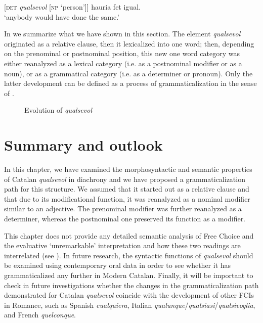 \documentclass[output=paper,colorlinks,citecolor=brown]{langscibook}
\begin{document}
\ea \label{ex:ka45}
    [\textsc{det} \textit{qualsevol} [\textsc{np} ‘person’]] hauria fet igual.\\
    ‘anybody would have done the same.’
\z

In  we summarize what we have shown in this section. The element \textit{qualsevol} originated as a relative clause, then it lexicalized into one word; then, depending on the prenominal or postnominal position, this new one word category was either reanalyzed as a lexical category (i.e. as a postnominal modifier or as a noun), or as a grammatical category (i.e. as a determiner or pronoun). Only the latter development can be defined as a process of grammaticalization in the sense of \citet{Lehmann1985}.

\begin{figure}
\caption{Evolution of \textit{qualsevol}}
\label{fig:ka46}
\end{figure}


\section{Summary and outlook}\label{sec:kea7}

In this chapter, we have examined the morphosyntactic and semantic properties of Catalan \textit{qualsevol} in diachrony and we have proposed a grammaticalization path for this structure. We assumed that it started out as a relative clause and that due to its modificational function, it was reanalyzed as a nominal modifier similar to an adjective. The prenominal modifier was further reanalyzed as a determiner, whereas the postnominal one preserved its function as a modifier.

This chapter does not provide any detailed semantic analysis of Free Choice and the evaluative ‘unremarkable’ interpretation and how these two readings are interrelated (see \cite{Kellert2021c}). In future research, the syntactic functions of \textit{qualsevol} should be examined using contemporary oral data in order to see whether it has grammaticalized any further in Modern Catalan. Finally, it will be important to check in future investigations whether the changes in the grammaticalization path demonstrated for Catalan \textit{qualsevol} coincide with the development of other FCIs in Romance, such as Spanish \textit{cualquiera}, Italian \textit{qualunque}\slash\textit{qualsiasi}\slash\textit{qualsivoglia}, and French \textit{quelconque}.
\end{document}
